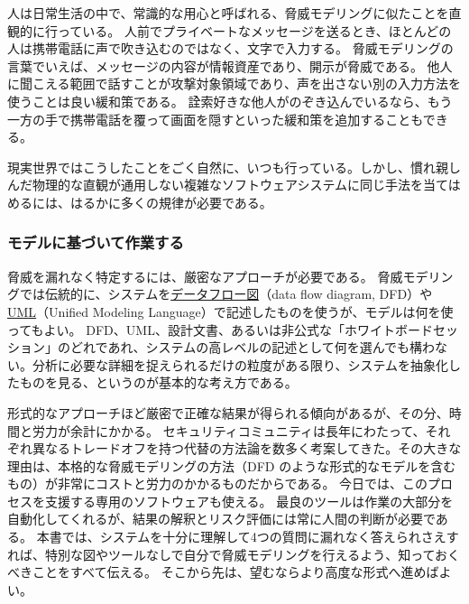 \documentclass[uplatex]{jsarticle}
\def\label#1{}%
\begin{document}
\begin{exa}[日常生活における脅威モデリング]\label{exa:ch2-private-message}
人は日常生活の中で、常識的な用心と呼ばれる、脅威モデリングに似たことを直観的に行っている。
人前でプライベートなメッセージを送るとき、ほとんどの人は携帯電話に声で吹き込むのではなく、文字で入力する。
脅威モデリングの言葉でいえば、メッセージの内容が情報資産であり、開示が脅威である。
他人に聞こえる範囲で話すことが攻撃対象領域であり、声を出さない別の入力方法を使うことは良い緩和策である。
詮索好きな他人がのぞき込んでいるなら、もう一方の手で携帯電話を覆って画面を隠すといった緩和策を追加することもできる。
\end{exa}

現実世界ではこうしたことをごく自然に、いつも行っている。しかし、慣れ親しんだ物理的な直観が通用しない複雑なソフトウェアシステムに同じ手法を当てはめるには、はるかに多くの規律が必要である。

\subsubsection{モデルに基づいて作業する}\label{subsec:ch2-work-from-model}

脅威を漏れなく特定するには、厳密なアプローチが必要である。
脅威モデリングでは伝統的に、システムを\underline{データフロー図}（data flow diagram, DFD）や \underline{UML}（Unified Modeling Language）で記述したものを使うが、モデルは何を使ってもよい。
DFD、UML、設計文書、あるいは非公式な「ホワイトボードセッション」のどれであれ、システムの高レベルの記述として何を選んでも構わない。分析に必要な詳細を捉えられるだけの粒度がある限り、システムを抽象化したものを見る、というのが基本的な考え方である。

形式的なアプローチほど厳密で正確な結果が得られる傾向があるが、その分、時間と労力が余計にかかる。
セキュリティコミュニティは長年にわたって、それぞれ異なるトレードオフを持つ代替の方法論を数多く考案してきた。その大きな理由は、本格的な脅威モデリングの方法（DFD のような形式的なモデルを含むもの）が非常にコストと労力のかかるものだからである。
今日では、このプロセスを支援する専用のソフトウェアも使える。
最良のツールは作業の大部分を自動化してくれるが、結果の解釈とリスク評価には常に人間の判断が必要である。
本書では、システムを十分に理解して4つの質問に漏れなく答えられさえすれば、特別な図やツールなしで自分で脅威モデリングを行えるよう、知っておくべきことをすべて伝える。
そこから先は、望むならより高度な形式へ進めばよい。
\end{document}

